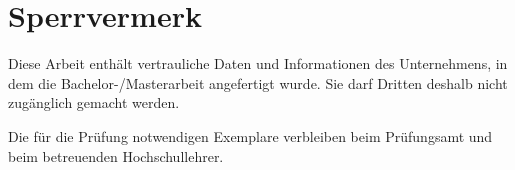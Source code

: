 

\newpage
\section*{Sperrvermerk}
\thispagestyle{empty}
Diese Arbeit enthält vertrauliche Daten und Informationen des Unternehmens, in dem die Bachelor-/Masterarbeit angefertigt wurde.
Sie darf Dritten deshalb nicht zugänglich gemacht werden.

Die für die Prüfung notwendigen Exemplare verbleiben beim Prüfungsamt und beim betreuenden Hochschullehrer.
\newpage

